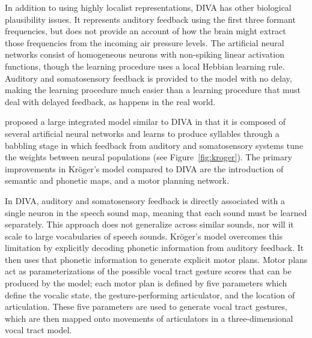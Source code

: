 In addition to using highly localist representations,
DIVA has other biological plausibility issues.
It represents auditory feedback using the first
three formant frequencies,
but does not provide an account of
how the brain might extract those
frequencies from the incoming air pressure levels.
The artificial neural networks
consist of homogeneous neurons
with non-spiking linear activation functions,
though the learning procedure
uses a local Hebbian learning rule.
Auditory and somatosensory feedback
is provided to the model with no delay,
making the learning procedure
much easier than a learning procedure
that must deal with delayed feedback,
as happens in the real world.

\citet{kroger2009,kroger2014a,kroger2015} proposed
a large integrated model
similar to DIVA in that
it is composed of
several artificial neural networks
and learns to produce syllables
through a babbling stage
in which feedback from
auditory and somatosensory systems
tune the weights between
neural populations
(see Figure~\ref{fig:kroger}).
The primary improvements in
Kr\"{o}ger's model compared to DIVA
are the introduction of semantic and  phonetic maps,
and a motor planning network.


In DIVA, auditory and somatosensory feedback
is directly associated with a single neuron
in the speech sound map,
meaning that each sound must be learned separately.
This approach does not generalize across
similar sounds, nor will it scale
to large vocabularies of speech sounds.
Kr\"{o}ger's model overcomes this limitation
by explicitly decoding phonetic information
from auditory feedback.
It then uses that phonetic information
to generate explicit motor plans.
Motor plans act as parameterizations
of the possible vocal tract gesture scores
that can be produced by the model;
each motor plan is defined by
five parameters which define
the vocalic state,
the gesture-performing articulator,
and the location of articulation.
These five parameters are used
to generate vocal tract gestures,
which are then mapped onto
movements of articulators
in a three-dimensional vocal tract model.


